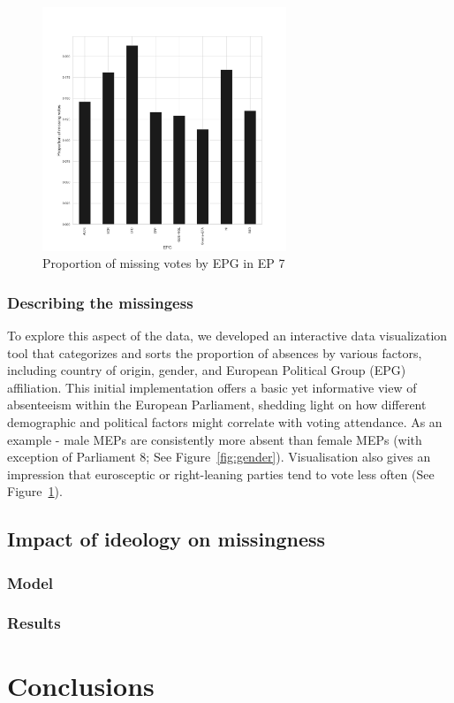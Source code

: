 \documentclass[a4paper,12pt]{report}
\begin{document}
    \begin{figure}[htb]
        \centering
        \includegraphics[width=0.65\textwidth]{Graphs/proportions_report}
        \caption{Proportion of missing votes by EPG in EP 7}
        \label{fig:proportions}
    \end{figure}

    \subsection{Describing the missingess}\label{subsec:describing-the-missingess}
    To explore this aspect of the data, we developed an interactive data visualization
    tool that categorizes and sorts the proportion of absences by various factors, including country of origin, gender,
    and European Political Group (EPG) affiliation. This initial implementation offers a basic yet
    informative view of
    absenteeism within the European Parliament, shedding light on how different demographic and political factors might
    correlate with voting attendance. As an example - male MEPs are consistently more absent than female MEPs (with
    exception of Parliament 8; See Figure~\ref{fig:gender}). Visualisation also gives an impression that eurosceptic
    or right-leaning parties tend to vote less often (See Figure~\ref{fig:proportions}).


    \section{Impact of ideology on missingness}\label{sec:impact-of-ideology-on-missingness}

    \subsection{Model}\label{subsec:model}

    \subsection{Results}\label{subsec:results}


    \chapter{Conclusions}\label{ch:conclusions}
\end{document}
